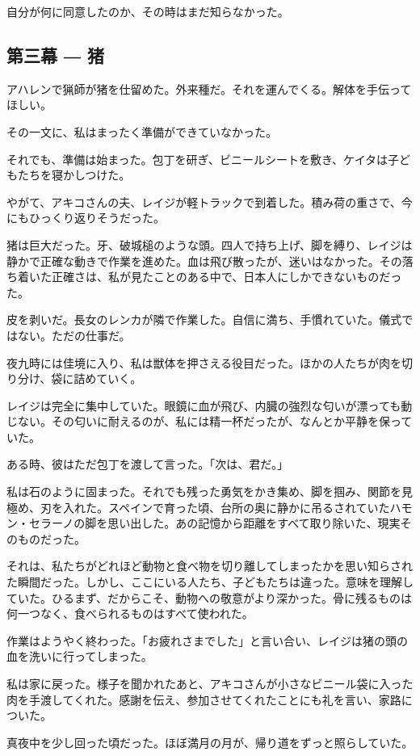 \documentclass[
  letterpaper,
  oneside]{scrbook}
\begin{document}
自分が何に同意したのか、その時はまだ知らなかった。

\subsection{第三幕 ― 猪}\label{ux7b2cux4e09ux5e55-ux732a}

アハレンで猟師が猪を仕留めた。外来種だ。それを運んでくる。解体を手伝ってほしい。

その一文に、私はまったく準備ができていなかった。

それでも、準備は始まった。包丁を研ぎ、ビニールシートを敷き、ケイタは子どもたちを寝かしつけた。

やがて、アキコさんの夫、レイジが軽トラックで到着した。積み荷の重さで、今にもひっくり返りそうだった。

猪は巨大だった。牙、破城槌のような頭。四人で持ち上げ、脚を縛り、レイジは静かで正確な動きで作業を進めた。血は飛び散ったが、迷いはなかった。その落ち着いた正確さは、私が見たことのある中で、日本人にしかできないものだった。

皮を剥いだ。長女のレンカが隣で作業した。自信に満ち、手慣れていた。儀式ではない。ただの仕事だ。

夜九時には佳境に入り、私は獣体を押さえる役目だった。ほかの人たちが肉を切り分け、袋に詰めていく。

レイジは完全に集中していた。眼鏡に血が飛び、内臓の強烈な匂いが漂っても動じない。その匂いに耐えるのが、私には精一杯だったが、なんとか平静を保っていた。

ある時、彼はただ包丁を渡して言った。「次は、君だ。」

私は石のように固まった。それでも残った勇気をかき集め、脚を掴み、関節を見極め、刃を入れた。スペインで育った頃、台所の奥に静かに吊るされていたハモン・セラーノの脚を思い出した。あの記憶から距離をすべて取り除いた、現実そのものだった。

それは、私たちがどれほど動物と食べ物を切り離してしまったかを思い知らされた瞬間だった。しかし、ここにいる人たち、子どもたちは違った。意味を理解していた。ひるまず、だからこそ、動物への敬意がより深かった。骨に残るものは何一つなく、食べられるものはすべて使われた。

作業はようやく終わった。「お疲れさまでした」と言い合い、レイジは猪の頭の血を洗いに行ってしまった。

私は家に戻った。様子を聞かれたあと、アキコさんが小さなビニール袋に入った肉を手渡してくれた。感謝を伝え、参加させてくれたことにも礼を言い、家路についた。

真夜中を少し回った頃だった。ほぼ満月の月が、帰り道をずっと照らしていた。
\end{document}
